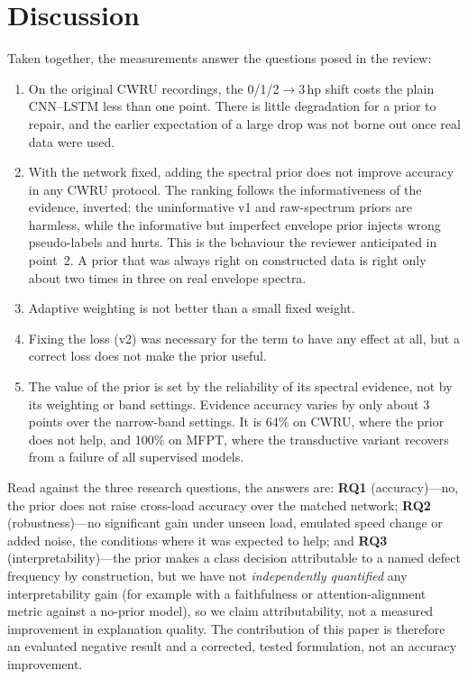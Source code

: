 \documentclass[conference]{IEEEtran}
\begin{document}
\section{Discussion}
\label{sec:discussion}
Taken together, the measurements answer the questions posed in the review:
\begin{enumerate}
\item On the original CWRU recordings, the 0/1/2$\to$3\,hp shift costs the
plain CNN--LSTM less than one point. There is little degradation for a prior
to repair, and the earlier expectation of a large drop was not borne out once
real data were used.
\item With the network fixed, adding the spectral prior does not improve accuracy
in any CWRU protocol. The ranking follows the informativeness of the evidence,
inverted: the uninformative v1 and raw-spectrum priors are harmless, while the
informative but imperfect envelope prior injects wrong pseudo-labels and hurts.
This is the behaviour the reviewer anticipated in point~2. A prior that was
always right on constructed data is right only about two times in three on real
envelope spectra.
\item Adaptive weighting is not better than a small fixed weight.
\item Fixing the loss (v2) was necessary for the term to have any effect at all,
but a correct loss does not make the prior useful.
\item The value of the prior is set by the reliability of its spectral
evidence, not by its weighting or band settings. Evidence accuracy varies by
only about 3 points over the narrow-band settings. It is 64\% on CWRU, where the
prior does not help, and 100\% on MFPT, where the transductive variant recovers
from a failure of all supervised models.
\end{enumerate}
Read against the three research questions, the answers are: \textbf{RQ1}
(accuracy)---no, the prior does not raise cross-load accuracy over the matched
network; \textbf{RQ2} (robustness)---no significant gain under unseen load,
emulated speed change or added noise, the conditions where it was expected to
help; and \textbf{RQ3} (interpretability)---the prior makes a class decision
attributable to a named defect frequency by construction, but we have not
\emph{independently quantified} any interpretability gain (for example with a
faithfulness or attention-alignment metric against a no-prior model), so we
claim attributability, not a measured improvement in explanation quality.
The contribution of this paper is therefore an evaluated negative result and a
corrected, tested formulation, not an accuracy improvement.
\end{document}
